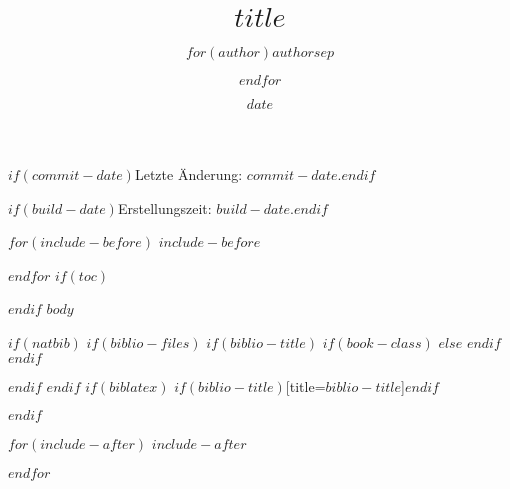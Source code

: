 \documentclass[
    10pt,
    a5paper,
    DIV=12, %
    BCOR=2mm,
    open=any, %
    ngerman
]{scrbook}
\title{$title$}
\author{$for(author)$$author$$sep$ \and $endfor$}
\date{$date$}
\begin{document}
\maketitle

$if(commit-date)$Letzte Änderung: $commit-date$.$endif$

$if(build-date)$Erstellungszeit: $build-date$.$endif$

$for(include-before)$
$include-before$

$endfor$
$if(toc)$
{
\hypersetup{linkcolor=black}
\setcounter{tocdepth}{$toc-depth$}
\renewcommand{\contentsname}{Inhaltsverzeichnis}
\renewcommand{\listfigurename}{Abbildungsverzeichnis}
\tableofcontents
\listoffigures
}
$endif$
$body$

$if(natbib)$
$if(biblio-files)$
$if(biblio-title)$
$if(book-class)$
\renewcommand\bibname{$biblio-title$}
$else$
\renewcommand\refname{$biblio-title$}
$endif$
$endif$


$endif$
$endif$
$if(biblatex)$
\printbibliography$if(biblio-title)$[title=$biblio-title$]$endif$

$endif$

$for(include-after)$
$include-after$

$endfor$
\end{document}
